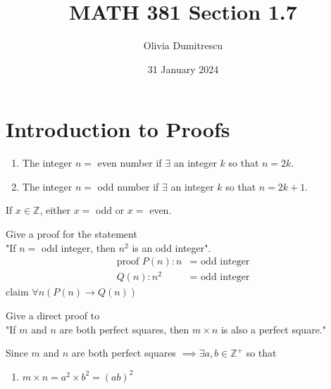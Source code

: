 \documentclass[a4paper, 12pt]{article}
\title{MATH 381 Section 1.7}
\author{Olivia Dumitrescu}
\date{31 January 2024}
\newenvironment{proof}[1][Proof]{\begin{trivlist}
\item[\hskip \labelsep {\bfseries #1}]}{\end{trivlist}}
\newenvironment{definition}[1][Definition]{\begin{trivlist}
\item[\hskip \labelsep {\bfseries #1}]}{\end{trivlist}}
\newenvironment{example}[1][Example]{\begin{trivlist}
\item[\hskip \labelsep {\bfseries #1}]}{\end{trivlist}}
\newcommand{\qed}{\nobreak \ifvmode \relax \else
    \ifdim\lastskip<1.5em \hskip-\lastskip
    \hskip1.5em plus0em minus0.5em \fi \nobreak
    \vrule height0.75em width0.5em depth0.25em\fi}
\newcommand{\then}{\rightarrow}
\begin{document}
    \maketitle
    \section*{Introduction to Proofs}
    \begin{definition}
        \hfill
        \begin{enumerate}
            \item The integer $n =$ even number if $\exists$ an integer $k$ so that $n = 2k$.
            \item The integer $n =$ odd number if $\exists$ an integer $k$ so that $n = 2k + 1$.
        \end{enumerate}
    \end{definition}
    If $x \in \mathbb{Z}$, either $x =$ odd or $x = $ even.
    \begin{example}
        Give a proof for the statement \\
        "If $n =$ odd integer, then $n^2$ is an odd integer". \\
        \begin{align*}
            \text{proof } P(n): n &= \text{ odd integer} \\
            Q(n): n^2 &= \text{ odd integer}
        \end{align*}
        claim $\forall n (P(n) \then Q(n))$
    \end{example}
    \begin{example}
        Give a direct proof to \\
        "If $m$ and $n$ are both perfect squares, then $m \times n$ is also a perfect square."
        \begin{proof}
            Since $m$ and $n$ are both perfect squares $\implies \exists a, b \in \mathbb{Z}^+$
            so that
            \begin{enumerate}
                \item $m \times n = a^2 \times b^2 = (ab)^2$ \qed
            \end{enumerate}
        \end{proof}
    \end{example}
\end{document}

